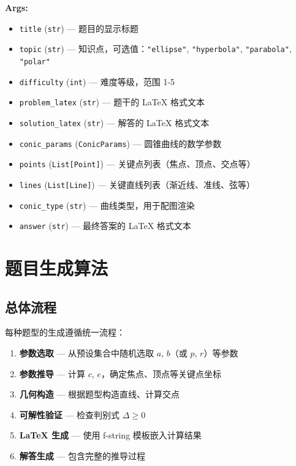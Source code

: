 \documentclass[11pt,a4paper]{article}
\begin{document}
\textbf{Args:}
\begin{itemize}
    \item \texttt{title} (\texttt{str}) — 题目的显示标题
    \item \texttt{topic} (\texttt{str}) — 知识点，可选值：\texttt{"ellipse"}, \texttt{"hyperbola"}, \texttt{"parabola"}, \texttt{"polar"}
    \item \texttt{difficulty} (\texttt{int}) — 难度等级，范围 1-5
    \item \texttt{problem\_latex} (\texttt{str}) — 题干的 LaTeX 格式文本
    \item \texttt{solution\_latex} (\texttt{str}) — 解答的 LaTeX 格式文本
    \item \texttt{conic\_params} (\texttt{ConicParams}) — 圆锥曲线的数学参数
    \item \texttt{points} (\texttt{List[Point]}) — 关键点列表（焦点、顶点、交点等）
    \item \texttt{lines} (\texttt{List[Line]}) — 关键直线列表（渐近线、准线、弦等）
    \item \texttt{conic\_type} (\texttt{str}) — 曲线类型，用于配图渲染
    \item \texttt{answer} (\texttt{str}) — 最终答案的 LaTeX 格式文本
\end{itemize}

\section{题目生成算法}

\subsection{总体流程}

每种题型的生成遵循统一流程：

\begin{enumerate}
    \item \textbf{参数选取} — 从预设集合中随机选取 $a$, $b$（或 $p$, $r$）等参数
    \item \textbf{参数推导} — 计算 $c$, $e$，确定焦点、顶点等关键点坐标
    \item \textbf{几何构造} — 根据题型构造直线、计算交点
    \item \textbf{可解性验证} — 检查判别式 $\Delta \geq 0$
    \item \textbf{LaTeX 生成} — 使用 f-string 模板嵌入计算结果
    \item \textbf{解答生成} — 包含完整的推导过程
\end{enumerate}
\end{document}
